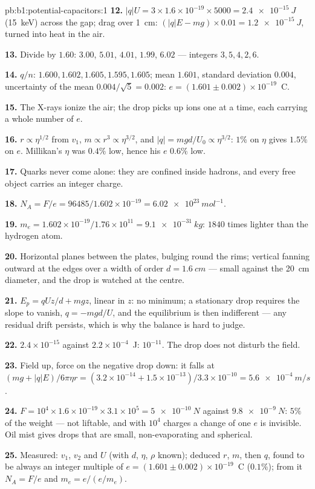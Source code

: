 \begin{solution}{pb:b1:potential-capacitors:1}
\textbf{12.} $|q|U = 3 \times 1.6 \times 10^{-19} \times 5000 = \qty{2.4e-15}{J}$
(\qty{15}{keV}) across the gap; drag over \qty{1}{cm}: $(|q|E - mg) \times 0.01 =
\qty{1.2e-15}{J}$, turned into heat in the air.

\textbf{13.} Divide by $1.60$: $3.00$, $5.01$, $4.01$, $1.99$, $6.02$ ---
integers $3, 5, 4, 2, 6$.

\textbf{14.} $q/n$: $1.600, 1.602, 1.605, 1.595, 1.605$; mean $1.601$,
standard deviation $0.004$, uncertainty of the mean $0.004/\sqrt5 =
0.002$: $e = (1.601 \pm 0.002) \times 10^{-19}$~C.

\textbf{15.} The X-rays ionize the air; the drop picks up ions one at a
time, each carrying a whole number of $e$.

\textbf{16.} $r \propto \eta^{1/2}$ from $v_1$, $m \propto r^3 \propto \eta^{3/2}$, and
$|q| = mgd/U_0 \propto \eta^{3/2}$: $1\%$ on $\eta$ gives $1.5\%$ on $e$. Millikan's
$\eta$ was $0.4\%$ low, hence his $e$ $0.6\%$ low.

\textbf{17.} Quarks never come alone: they are confined inside hadrons,
and every free object carries an integer charge.

\textbf{18.} $N_A = F/e = 96485/1.602 \times 10^{-19} = \qty{6.02e23}{mol^{-1}}$.

\textbf{19.} $m_e = 1.602 \times 10^{-19}/1.76 \times 10^{11} = \qty{9.1e-31}{kg}$: $1840$
times lighter than the hydrogen atom.

\textbf{20.} Horizontal planes between the plates, bulging round the
rims; vertical  fanning outward at the edges over a width of
order $d = \qty{1.6}{cm}$ --- small against the \qty{20}{cm} diameter, and
the drop is watched at the centre.

\textbf{21.} $E_p = qUz/d + mgz$, linear in $z$: no minimum; a stationary
drop requires the slope to vanish, $q = -mgd/U$, and the equilibrium is
then indifferent --- any residual drift persists, which is why the
balance is hard to judge.

\textbf{22.} $2.4 \times 10^{-15}$ against $2.2 \times 10^{-4}$~J: $10^{-11}$. The drop
does not disturb the field.

\textbf{23.} Field up, force on the negative drop down: it falls at $(mg
+ |q|E)/6\pi\eta r = (3.2 \times 10^{-14} + 1.5 \times 10^{-13})/3.3 \times 10^{-10} =
\qty{5.6e-4}{m/s}$.

\textbf{24.} $F = 10^4 \times 1.6 \times 10^{-19} \times 3.1 \times 10^5 = \qty{5e-10}{N}$
against $\qty{9.8e-9}{N}$: $5\%$ of the weight --- not liftable, and with
$10^4$ charges a change of one $e$ is invisible. Oil mist gives drops
that are small, non-evaporating and spherical.

\textbf{25.} Measured: $v_1$, $v_2$ and $U$ (with $d$, $\eta$, $\rho$ known);
deduced $r$, $m$, then $q$, found to be always an integer multiple of
$e = (1.601 \pm 0.002) \times 10^{-19}$~C ($0.1\%$); from it $N_A = F/e$ and
$m_e = e/(e/m_e)$.
\end{solution}
